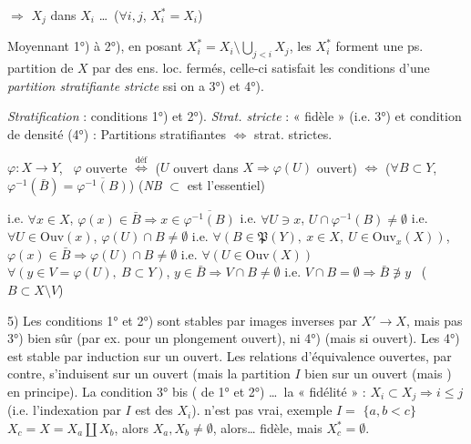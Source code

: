 \documentclass[11pt,a4paper]{article}
\begin{document}
$\Longrightarrow$ \struck{\ill{}} $X_j$ \ill{} dans $X_i$ \ldots\ ($\forall i,j$, $X_i^{*}=X_i$)

 Moyennant 1°) à 2°), en posant $X_i^{*}=X_i\setminus\bigcup_{j<i}X_j$, les $X_i^{*}$ forment une ps. partition  de $X$ par des ens. loc. fermés, celle-ci satisfait les conditions d'une \emph{partition stratifiante stricte}  ssi on a 3°) et 4°).

\emph{Stratification} : conditions 1°) et 2°). \emph{Strat. stricte} : « fidèle » (i.e. 3°) et condition de densité (4°) : Partitions stratifiantes $\Longleftrightarrow$ strat. strictes.

$\varphi:X\to Y$, \ $\varphi$ ouverte $\overset{\text{déf}}{\Longleftrightarrow}$ ($U$ ouvert dans $X\Rightarrow\varphi(U)$ ouvert)
$\Longleftrightarrow$ \struck{\ill{}} ($\forall B\subset Y$, $\varphi^{-1}(\bar B)=\overline{\varphi^{-1}(B)}$) (\emph{NB} $\subset$ est l'essentiel)

i.e. $\forall x\in X$, $\varphi(x)\in\bar B\Rightarrow x\in\overline{\varphi^{-1}(B)}$ i.e. $\forall U\ni x$, $U\cap\varphi^{-1}(B)\neq\emptyset$ i.e. $\forall U\in\mathrm{Ouv}(x)$, $\varphi(U)\cap B\neq\emptyset$ i.e. $\forall(B\in\mathfrak{P}(Y),\ x\in X,\ U\in\mathrm{Ouv}_x(X))$, $\varphi(x)\in\bar B\Rightarrow\varphi(U)\cap B\neq\emptyset$ i.e. $\forall(U\in\mathrm{Ouv}(X))$ $\forall(y\in V=\varphi(U),\ B\subset Y)$, $y\in\bar B\Rightarrow V\cap B\neq\emptyset$ i.e. $V\cap B=\emptyset\Rightarrow\bar B\not\ni y$ \ ($B\subset X\setminus V$)



5) Les conditions 1° et 2°) sont stables par images inverses par $X'\to X$, mais pas 3°) bien sûr (par ex. pour un plongement ouvert), ni 4°) (mais si \ill{} ouvert). Les 4°) est stable par induction sur un ouvert. Les relations d'équivalence ouvertes, par contre, s'induisent  sur un ouvert (mais la partition $I$  bien sur un ouvert (mais \ill{}) en principe).  La condition 3° bis ( de 1° et 2°) \ldots\ la « fidélité » : $X_i\subset X_j\Longrightarrow i\le j$ (i.e. l'indexation par $I$ est \ill{}  \struck{\ill{}} des $X_i$).  n'est pas vrai, exemple $I=$ \struck{\ill{}} $\lbrace a,b<c\rbrace$
$X_c=X=X_a\amalg X_b$, \struck{\ill{}} alors $X_a,X_b\neq\emptyset$, alors\ldots
fidèle,  mais $X_c^{*}=\emptyset$.
\end{document}
